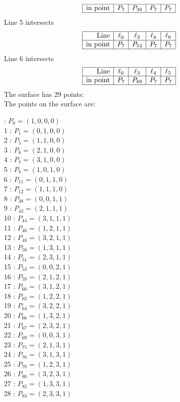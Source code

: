 \documentclass{article}
\begin{document}
{$$\begin{array}{|r*{4}{|c}|}
\hline
\mbox{in point}  & P_{7} & P_{38} & P_{7} & P_{7}\\
\hline
\end{array}
$$
Line 5 intersects 
$$
\begin{array}{|r*{4}{|c}|}
\hline
\mbox{Line}  & \ell_{0} & \ell_{2} & \ell_{4} & \ell_{6}\\
\hline
\mbox{in point}  & P_{7} & P_{53} & P_{7} & P_{7}\\
\hline
\end{array}
$$
Line 6 intersects 
$$
\begin{array}{|r*{4}{|c}|}
\hline
\mbox{Line}  & \ell_{0} & \ell_{3} & \ell_{4} & \ell_{5}\\
\hline
\mbox{in point}  & P_{7} & P_{69} & P_{7} & P_{7}\\
\hline
\end{array}
$$
The surface has 29 points:\\
The points on the surface are:\\
\begin{multicols}{3}
 : $P_{0}=( 1, 0, 0, 0 )$\\
1 : $P_{1}=( 0, 1, 0, 0 )$\\
2 : $P_{5}=( 1, 1, 0, 0 )$\\
3 : $P_{6}=( 2, 1, 0, 0 )$\\
4 : $P_{7}=( 3, 1, 0, 0 )$\\
5 : $P_{8}=( 1, 0, 1, 0 )$\\
6 : $P_{11}=( 0, 1, 1, 0 )$\\
7 : $P_{12}=( 1, 1, 1, 0 )$\\
8 : $P_{38}=( 0, 0, 1, 1 )$\\
9 : $P_{43}=( 2, 1, 1, 1 )$\\
10 : $P_{44}=( 3, 1, 1, 1 )$\\
11 : $P_{46}=( 1, 2, 1, 1 )$\\
12 : $P_{48}=( 3, 2, 1, 1 )$\\
13 : $P_{50}=( 1, 3, 1, 1 )$\\
14 : $P_{51}=( 2, 3, 1, 1 )$\\
15 : $P_{53}=( 0, 0, 2, 1 )$\\
16 : $P_{59}=( 2, 1, 2, 1 )$\\
17 : $P_{60}=( 3, 1, 2, 1 )$\\
18 : $P_{62}=( 1, 2, 2, 1 )$\\
19 : $P_{64}=( 3, 2, 2, 1 )$\\
20 : $P_{66}=( 1, 3, 2, 1 )$\\
21 : $P_{67}=( 2, 3, 2, 1 )$\\
22 : $P_{69}=( 0, 0, 3, 1 )$\\
23 : $P_{75}=( 2, 1, 3, 1 )$\\
24 : $P_{76}=( 3, 1, 3, 1 )$\\
25 : $P_{78}=( 1, 2, 3, 1 )$\\
26 : $P_{80}=( 3, 2, 3, 1 )$\\
27 : $P_{82}=( 1, 3, 3, 1 )$\\
28 : $P_{83}=( 2, 3, 3, 1 )$\\
\end{multicols}


}
\end{document}
